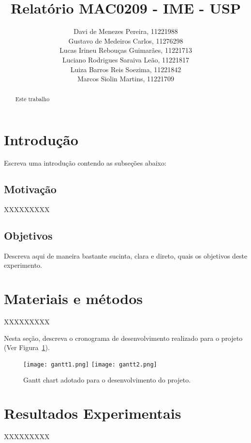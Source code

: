 \documentclass[12pt]{article}
\title{Relatório MAC0209 - IME - USP}
\author{Davi de Menezes Pereira, 11221988\\
Gustavo de Medeiros Carlos, 11276298\\
Lucas Irineu Rebouças Guimarães, 11221713\\
Luciano Rodrigues Saraiva Leão, 11221817\\
Luiza Barros Reis Soezima, 11221842\\
Marcos Siolin Martins, 11221709}
\begin{document}
\maketitle

\begin{abstract}
    Este trabalho 
\end{abstract}

\tableofcontents

\newpage

\section{Introdução}

Escreva uma introdução contendo as subseções abaixo:

\subsection{Motivação}

XXXXXXXXX

\subsection{Objetivos}

Descreva aqui de maneira bastante sucinta, clara e direto, quais os objetivos deste experimento.

\section{Materiais e métodos}

XXXXXXXXX

Nesta seção, descreva o cronograma de desenvolvimento realizado para o projeto (Ver Figura~\ref{fig:gantt}).

\begin{figure}
  \begin{center}
    \texttt{[image: gantt1.png]}
    \texttt{[image: gantt2.png]}
    \caption{\label{fig:gantt} Gantt chart adotado para o desenvolvimento do projeto.}
  \end{center}
\end{figure}

\section{Resultados Experimentais}

XXXXXXXXX
\end{document}
